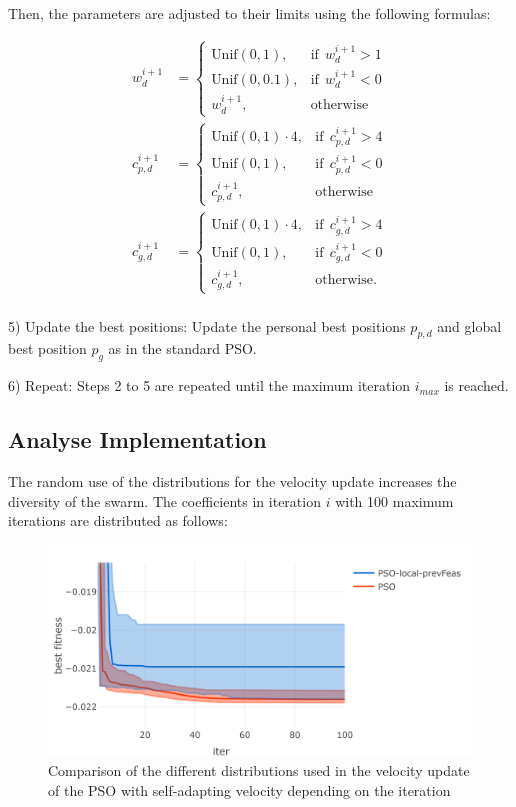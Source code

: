 \documentclass[
  oneside, a4paper, 12pt, openany]{book}
\theoremstyle{definition}
\theoremstyle{definition}
\theoremstyle{definition}
\theoremstyle{definition}
\theoremstyle{remark}
\begin{document}
Then, the parameters are adjusted to their limits using the following formulas:

\begin{align*}
w_d^{i+1} &= 
  \begin{cases}
    \text{Unif}(0,1), & \text{if}\ \ w_d^{i+1} > 1\\
    \text{Unif}(0,0.1), & \text{if}\ \  w_d^{i+1} < 0\\
    w_d^{i+1}, & \text{otherwise}
  \end{cases}\\
c_{p,d}^{i+1} &= 
  \begin{cases}
    \text{Unif}(0,1) \cdot 4, & \text{if}\ \ c_{p,d}^{i+1} > 4\\
    \text{Unif}(0,1), & \text{if}\ \  c_{p,d}^{i+1} < 0\\
    c_{p,d}^{i+1}, & \text{otherwise}
  \end{cases}\\
c_{g,d}^{i+1} &= 
  \begin{cases}
    \text{Unif}(0,1) \cdot 4, & \text{if}\ \ c_{g,d}^{i+1} > 4\\
    \text{Unif}(0,1), & \text{if}\ \  c_{g,d}^{i+1} < 0\\
    c_{g,d}^{i+1}, & \text{otherwise.}
  \end{cases}\\
\end{align*}

5) Update the best positions: Update the personal best positions \(p_{p,d}\) and global best position \(p_g\) as in the standard PSO.

6) Repeat: Steps 2 to 5 are repeated until the maximum iteration \(i_{max}\) is reached.

\hypertarget{analyse-implementation}{%
\subsection{Analyse Implementation}\label{analyse-implementation}}

The random use of the distributions for the velocity update increases the diversity of the swarm. The coefficients in iteration \(i\) with 100 maximum iterations are distributed as follows:

\begin{figure}[H]
\includegraphics{Master_Thesis_files/figure-latex/unnamed-chunk-14-1} \caption{Comparison of the different distributions used in the velocity update of the PSO with self-adapting velocity depending on the iteration}\label{fig:unnamed-chunk-14}
\end{figure}
\end{document}
